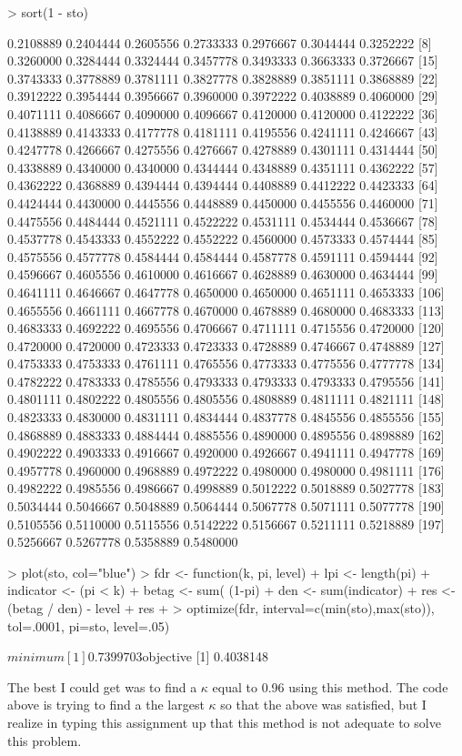 \documentclass{article}
\begin{document}
\begin{Schunk}
\begin{Soutput}
\end{Soutput}
\begin{Sinput}
> sort(1 - sto)
\end{Sinput}
\begin{Soutput}
  [1] 0.2108889 0.2404444 0.2605556 0.2733333 0.2976667 0.3044444 0.3252222
  [8] 0.3260000 0.3284444 0.3324444 0.3457778 0.3493333 0.3663333 0.3726667
 [15] 0.3743333 0.3778889 0.3781111 0.3827778 0.3828889 0.3851111 0.3868889
 [22] 0.3912222 0.3954444 0.3956667 0.3960000 0.3972222 0.4038889 0.4060000
 [29] 0.4071111 0.4086667 0.4090000 0.4096667 0.4120000 0.4120000 0.4122222
 [36] 0.4138889 0.4143333 0.4177778 0.4181111 0.4195556 0.4241111 0.4246667
 [43] 0.4247778 0.4266667 0.4275556 0.4276667 0.4278889 0.4301111 0.4314444
 [50] 0.4338889 0.4340000 0.4340000 0.4344444 0.4348889 0.4351111 0.4362222
 [57] 0.4362222 0.4368889 0.4394444 0.4394444 0.4408889 0.4412222 0.4423333
 [64] 0.4424444 0.4430000 0.4445556 0.4448889 0.4450000 0.4455556 0.4460000
 [71] 0.4475556 0.4484444 0.4521111 0.4522222 0.4531111 0.4534444 0.4536667
 [78] 0.4537778 0.4543333 0.4552222 0.4552222 0.4560000 0.4573333 0.4574444
 [85] 0.4575556 0.4577778 0.4584444 0.4584444 0.4587778 0.4591111 0.4594444
 [92] 0.4596667 0.4605556 0.4610000 0.4616667 0.4628889 0.4630000 0.4634444
 [99] 0.4641111 0.4646667 0.4647778 0.4650000 0.4650000 0.4651111 0.4653333
[106] 0.4655556 0.4661111 0.4667778 0.4670000 0.4678889 0.4680000 0.4683333
[113] 0.4683333 0.4692222 0.4695556 0.4706667 0.4711111 0.4715556 0.4720000
[120] 0.4720000 0.4720000 0.4723333 0.4723333 0.4728889 0.4746667 0.4748889
[127] 0.4753333 0.4753333 0.4761111 0.4765556 0.4773333 0.4775556 0.4777778
[134] 0.4782222 0.4783333 0.4785556 0.4793333 0.4793333 0.4793333 0.4795556
[141] 0.4801111 0.4802222 0.4805556 0.4805556 0.4808889 0.4811111 0.4821111
[148] 0.4823333 0.4830000 0.4831111 0.4834444 0.4837778 0.4845556 0.4855556
[155] 0.4868889 0.4883333 0.4884444 0.4885556 0.4890000 0.4895556 0.4898889
[162] 0.4902222 0.4903333 0.4916667 0.4920000 0.4926667 0.4941111 0.4947778
[169] 0.4957778 0.4960000 0.4968889 0.4972222 0.4980000 0.4980000 0.4981111
[176] 0.4982222 0.4985556 0.4986667 0.4998889 0.5012222 0.5018889 0.5027778
[183] 0.5034444 0.5046667 0.5048889 0.5064444 0.5067778 0.5071111 0.5077778
[190] 0.5105556 0.5110000 0.5115556 0.5142222 0.5156667 0.5211111 0.5218889
[197] 0.5256667 0.5267778 0.5358889 0.5480000
\end{Soutput}
\begin{Sinput}
> plot(sto, col="blue")
> fdr <- function(k, pi, level){
+   lpi <- length(pi)
+   indicator <- (pi < k)
+   betag <- sum( (1-pi) %*% indicator )
+   den <- sum(indicator)
+   res <- (betag / den) - level
+   res
+ }
> optimize(fdr, interval=c(min(sto),max(sto)), tol=.0001, pi=sto, level=.05)
\end{Sinput}
\begin{Soutput}
$minimum
[1] 0.7399703

$objective
[1] 0.4038148
\end{Soutput}
\end{Schunk}
The best  I could get was to find a $ \kappa $ equal to 0.96 using this method. The code above is trying to find a the largest $ \kappa $ so that the above was satisfied, but I realize in typing this assignment up that this method is not adequate to solve this problem. 
\end{document}
